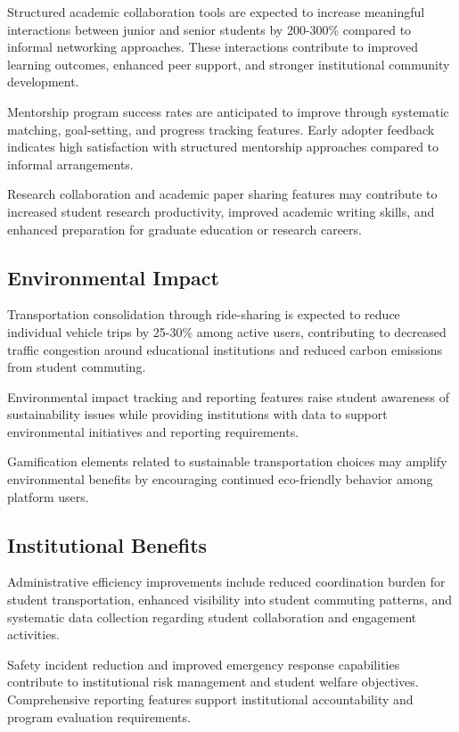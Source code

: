 \documentclass[conference]{IEEEtran}
\begin{document}
Structured academic collaboration tools are expected to increase meaningful interactions between junior and senior students by 200-300\% compared to informal networking approaches. These interactions contribute to improved learning outcomes, enhanced peer support, and stronger institutional community development.

Mentorship program success rates are anticipated to improve through systematic matching, goal-setting, and progress tracking features. Early adopter feedback indicates high satisfaction with structured mentorship approaches compared to informal arrangements.

Research collaboration and academic paper sharing features may contribute to increased student research productivity, improved academic writing skills, and enhanced preparation for graduate education or research careers.

\subsection{Environmental Impact}

Transportation consolidation through ride-sharing is expected to reduce individual vehicle trips by 25-30\% among active users, contributing to decreased traffic congestion around educational institutions and reduced carbon emissions from student commuting.

Environmental impact tracking and reporting features raise student awareness of sustainability issues while providing institutions with data to support environmental initiatives and reporting requirements.

Gamification elements related to sustainable transportation choices may amplify environmental benefits by encouraging continued eco-friendly behavior among platform users.

\subsection{Institutional Benefits}

Administrative efficiency improvements include reduced coordination burden for student transportation, enhanced visibility into student commuting patterns, and systematic data collection regarding student collaboration and engagement activities.

Safety incident reduction and improved emergency response capabilities contribute to institutional risk management and student welfare objectives. Comprehensive reporting features support institutional accountability and program evaluation requirements.
\end{document}
